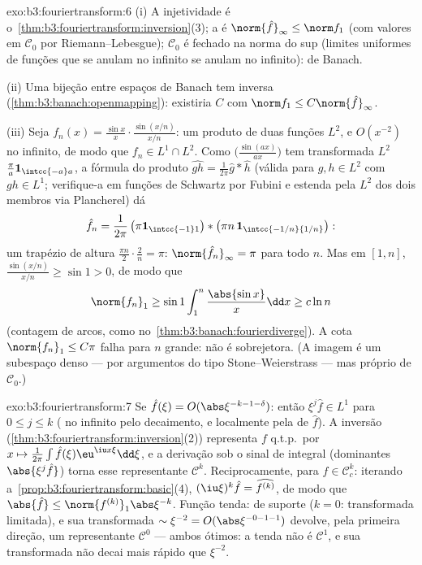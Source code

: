 \begin{solution}{exo:b3:fouriertransform:6}
(i) A injetividade é o~\cref{thm:b3:fouriertransform:inversion}(3); a  é
$\norm{\hat f}_\infty \leq \norm f_1$ (com valores em
$\mathcal C_0$ por Riemann--Lebesgue); $\mathcal C_0$ é fechado
na norma do sup (limites uniformes de funções que se anulam no
infinito se anulam no infinito): de Banach.

(ii) Uma bijeção  entre espaços de Banach tem
inversa  (\cref{thm:b3:banach:openmapping}): existiria
$C$ com $\norm f_1 \leq C\norm{\hat f}_\infty$.

(iii) Seja $f_n(x) = \frac{\sin x}x\cdot\frac{\sin(x/n)}{x/n}$:
um produto de duas funções $L^2$, e $O(x^{-2})$ no
infinito, de modo que $f_n \in L^1\cap L^2$. Como
$\bigl(\frac{\sin(ax)}{ax}\bigr)$ tem transformada $L^2$
$\frac\pi a\mathbf 1_{\intcc{-a}a}$, a fórmula do produto
$\widehat{gh} = \frac1{2\pi}\hat g * \hat h$ (válida para $g, h
\in L^2$ com $gh \in L^1$; verifique-a em funções de Schwartz por
Fubini e estenda pela  $L^2$ dos dois membros via
Plancherel) dá
\[
\hat f_n = \frac1{2\pi}\,\bigl(\pi\mathbf
1_{\intcc{-1}1}\bigr) * \bigl(\pi n\,\mathbf
1_{\intcc{-1/n}{1/n}}\bigr):
\]
um trapézio de altura $\frac{\pi n}2\cdot\frac2n = \pi$:
$\norm{\hat f_n}_\infty = \pi$ para todo $n$. Mas em $[1,
n]$, $\frac{\sin(x/n)}{x/n} \geq \sin 1 > 0$, de modo que
\[
\norm{f_n}_1 \geq \sin 1\int_1^n\frac{\abs{\sin x}}x\dd x
\geq c\ln n
\]
(contagem de arcos, como no~\cref{thm:b3:banach:fourierdiverge}).
A cota $\norm{f_n}_1 \leq C\pi$ falha para $n$ grande: não é
sobrejetora. (A imagem é um subespaço denso --- por
argumentos do tipo Stone--Weierstrass --- mas próprio de
$\mathcal C_0$.)
\end{solution}

\begin{solution}{exo:b3:fouriertransform:7}
Se $\hat f(\xi) = O(\abs\xi^{-k-1-\delta})$: então $\xi^j\hat f
\in L^1$ para $0 \leq j \leq k$ ( no infinito pelo
decaimento, e localmente pela  de $\hat f$). A inversão
(\cref{thm:b3:fouriertransform:inversion}(2)) representa $f$
q.t.p.\ por $x \mapsto \frac1{2\pi}\int\hat f(\xi)\eu^{\iu
x\xi}\dd\xi$, e a derivação sob o sinal de integral
(dominantes $\abs{\xi^j\hat f}$) torna esse representante
$\mathcal C^k$. Reciprocamente, para $f \in \mathcal C_c^k$:
iterando a~\cref{prop:b3:fouriertransform:basic}(4),
$(\iu\xi)^k\hat f = \widehat{f^{(k)}}$, de modo que $\abs{\hat f} \leq
\norm{f^{(k)}}_1\abs\xi^{-k}$. Função tenda:  de
suporte  ($k = 0$: transformada limitada), e sua
transformada $\sim \xi^{-2} = O(\abs\xi^{-0-1-1})$ devolve, pela
primeira direção, um representante $\mathcal C^0$ --- ambos
ótimos: a tenda não é $\mathcal C^1$, e sua transformada
não decai mais rápido que $\xi^{-2}$.
\end{solution}


